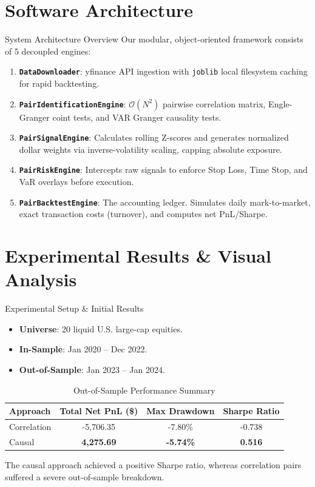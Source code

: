 \documentclass[11pt,aspectratio=169]{beamer}
\begin{document}
\section{Software Architecture}
\begin{frame}{System Architecture Overview}
    Our modular, object-oriented framework consists of 5 decoupled engines:
    \vspace{0.2cm}
    \begin{enumerate}
        \item \textbf{\texttt{DataDownloader}}: yfinance API ingestion with \texttt{joblib} local filesystem caching for rapid backtesting.
        \item \textbf{\texttt{PairIdentificationEngine}}: $\mathcal{O}(N^2)$ pairwise correlation matrix, Engle-Granger coint tests, and VAR Granger causality tests.
        \item \textbf{\texttt{PairSignalEngine}}: Calculates rolling Z-scores and generates normalized dollar weights via inverse-volatility scaling, capping absolute exposure.
        \item \textbf{\texttt{PairRiskEngine}}: Intercepts raw signals to enforce Stop Loss, Time Stop, and VaR overlays before execution.
        \item \textbf{\texttt{PairBacktestEngine}}: The accounting ledger. Simulates daily mark-to-market, exact transaction costs (turnover), and computes net PnL/Sharpe.
    \end{enumerate}
\end{frame}

\section{Experimental Results \& Visual Analysis}
\begin{frame}{Experimental Setup \& Initial Results}
    \begin{itemize}
        \item \textbf{Universe}: 20 liquid U.S. large-cap equities.
        \item \textbf{In-Sample}: Jan 2020 -- Dec 2022.
        \item \textbf{Out-of-Sample}: Jan 2023 -- Jan 2024.
    \end{itemize}
    \vspace{0.2cm}
    \begin{table}
        \centering
        \caption{Out-of-Sample Performance Summary}
        \begin{tabular}{@{}lccc@{}}
            \toprule
            \textbf{Approach} & \textbf{Total Net PnL (\$)} & \textbf{Max Drawdown} & \textbf{Sharpe Ratio} \\
            \midrule
            Correlation & -5,706.35 & -7.80\% & -0.738 \\
            Causal & \textbf{4,275.69} & \textbf{-5.74\%} & \textbf{0.516} \\
            \bottomrule
        \end{tabular}
    \end{table}
    The causal approach achieved a positive Sharpe ratio, whereas correlation pairs suffered a severe out-of-sample breakdown.
\end{frame}
\end{document}
